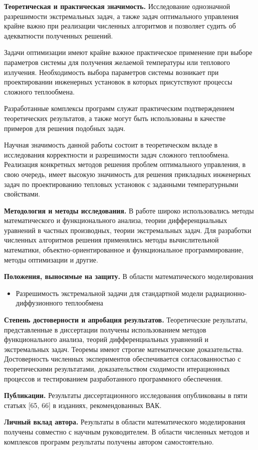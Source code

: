 \textbf{Теоретическая и практическая значимость.}
Исследование однозначной разрешимости экстремальных задач, а также задач оптимального
управления крайне важно при реализации численных алгоритмов и позволяет судить об адекватности полученных решений.

Задачи оптимизации имеют крайне важное практическое применение при выборе параметров системы для
получения желаемой температуры или теплового излучения.
Необходимость выбора параметров системы возникает при проектировании инженерных установок
в которых присутствуют процессы сложного теплообмена.

Разработанные комплексы программ служат практическим подтверждением теоретических результатов,
а также могут быть использованы в качестве примеров для решения подобных задач.


Научная значимость данной работы состоит в теоретическом вкладе в исследования корректности и
разрешимости задач сложного теплообмена.
Реализация конкретных методов решения проблем оптимального управления, в свою очередь, имеет высокую
значимость для решения прикладных инженерных задач по проектированию тепловых установок с
заданными температурными свойствами.


\textbf{Методология и методы исследования.}
В работе широко использовались методы математического и функционального анализа, теории дифференциальных
уравнений в частных производных, теории экстремальных задач.
Для разработки численных алгоритмов решения применялись методы вычислительной математики,
объектно-ориентированное и функциональное программирование, методы оптимизации и другие.


\textbf{Положения, выносимые на защиту.}
В области математического моделирования
\begin{itemize}
    \item Разрешимость экстремальной задачи для стандартной модели радиационно-диффузионного теплообмена
\end{itemize}


\textbf{Степень достоверности и апробация результатов.}
Теоретические результаты, представленные в диссертации получены
использованием методов функционального анализа, теорий
дифференциальных уравнений и экстремальных задач.
Теоремы имеют строгие математические доказательства.
Достоверность численных экспериментов обеспечивается согласованностью
с теоретическими результатами, доказательством
сходимости итерационных процессов и тестированием разработанного программного обеспечения.

\textbf{Публикации.}
Результаты диссертационного исследования опубликованы в пяти статьях [65, 66] в изданиях, рекомендованных ВАК.


\textbf{Личный вклад автора.}
Результаты в области математического моделирования получены совместно с научным руководителем.
В области численных методов и комплексов программ результаты получены автором самостоятельно.
